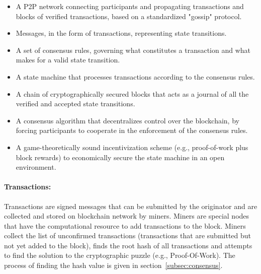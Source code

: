 \begin{itemize}
	\item A P2P network connecting participants and propagating transactions
		and blocks of verified transactions, based on a standardized "gossip"
		protocol. 
	\item Messages, in the form of transactions, representing state
		transitions.
	\item A set of consensus rules, governing what constitutes a transaction
		and what makes for a valid state transition.
	\item A state machine that processes transactions according to the
		consensus rules.
	\item A chain of cryptographically secured blocks that acts as a journal of
		all the verified and accepted state transitions.
	\item A consensus algorithm that decentralizes control over the blockchain,
		by forcing participants to cooperate in the enforcement of the
		consensus rules. 
	\item A game-theoretically sound incentivization scheme (e.g.,
		proof-of-work plus block rewards) to economically secure the state
		machine in an open environment.
\end{itemize}

\paragraph{Transactions:} Transactions are signed messages that can be
submitted by the originator and are collected and stored on blockchain network
by miners. Miners are special nodes that have the computational resource to add
transactions to the block. Miners collect the list of unconfirmed transactions
(transactions that are submitted but not yet added to the block), finds the root
hash of all transactions and attempts to find the solution to the cryptographic
puzzle (e.g., Proof-Of-Work). The process of finding the hash value is given in
section~\ref{subsec:consensus}.

